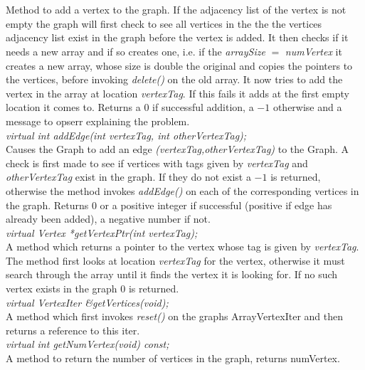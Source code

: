   \\
  \\
Method to add a vertex to the graph. If the adjacency list
of the vertex is not empty the graph will first check to see all
vertices in the the the vertices adjacency list exist in the graph
before the vertex is added. It then checks if it needs a new array
and if so creates one, i.e. if the {\em arraySize} $=$ {\em
numVertex} it creates a new array, whose size is double the original
and copies the pointers to the vertices, before invoking {\em
delete()} on the old array. It now tries to add the vertex in the
array at location {\em vertexTag}. If this fails it adds at the first
empty location it comes to. Returns a 0 if successful addition, a
$-1$ otherwise and a message to opserr explaining the problem. \\ 

{\em virtual int addEdge(int vertexTag, int otherVertexTag); } \\
Causes the Graph to add an edge {\em (vertexTag,otherVertexTag)} to
the Graph. A check is first made to see if vertices with tags given by
{\em vertexTag} and {\em otherVertexTag} exist in the graph. If they
do not exist a $-1$ is returned, otherwise the method invokes {\em
addEdge()} on each of the corresponding vertices in the 
graph. Returns $0$ or a positive integer if successful (positive if
edge has already been added), a negative number if not.\\ 


{\em virtual Vertex *getVertexPtr(int vertexTag);} \\
A method which returns a pointer to the vertex whose tag is given by {\em
vertexTag}. The method first looks at location {\em vertexTag} for the
vertex, otherwise it must search through the array until it finds the
vertex it is looking for. If no such vertex exists in the graph $0$ is
returned.\\ 

{\em virtual VertexIter \&getVertices(void);} \\
A method which first invokes {\em reset()} on the graphs ArrayVertexIter
and then returns a reference to this iter.\\

{\em virtual int getNumVertex(void) const;} \\
A method to return the number of vertices in the graph, returns numVertex. \\


